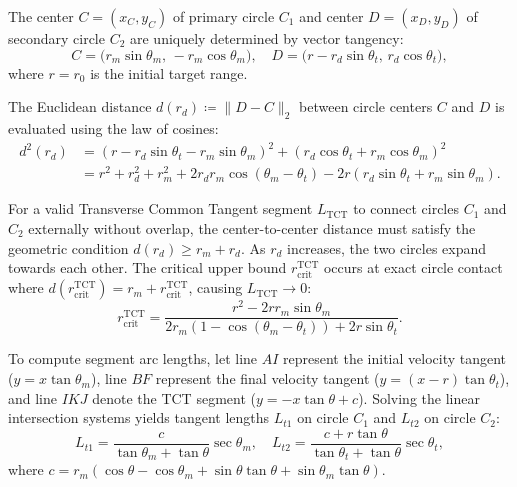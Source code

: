 The center $C = (x_C, y_C)$ of primary circle $C_1$ and center $D = (x_D, y_D)$ of secondary circle $C_2$ are uniquely determined by vector tangency:
\begin{equation}\label{eq:ch_DP_centers_samesign}
	C = \big(r_m \sin \theta_m, \, -r_m \cos \theta_m\big), \quad D = \big(r - r_d \sin \theta_t, \, r_d \cos \theta_t\big),
\end{equation}
where $r = r_0$ is the initial target range.

The Euclidean distance $d(r_d) \coloneqq \|D - C\|_2$ between circle centers $C$ and $D$ is evaluated using the law of cosines:
\begin{align}\label{eq:ch_DP_center_distance}
	d^2(r_d) &= (r - r_d \sin \theta_t - r_m \sin \theta_m)^2 + (r_d \cos \theta_t + r_m \cos \theta_m)^2 \nonumber \\
	&= r^2 + r_d^2 + r_m^2 + 2 r_d r_m \cos(\theta_m - \theta_t) - 2 r (r_d \sin \theta_t + r_m \sin \theta_m).
\end{align}

For a valid Transverse Common Tangent segment $L_{\text{TCT}}$ to connect circles $C_1$ and $C_2$ externally without overlap, the center-to-center distance must satisfy the geometric condition $d(r_d) \ge r_m + r_d$. As $r_d$ increases, the two circles expand towards each other. The critical upper bound $r_{\text{crit}}^{\text{TCT}}$ occurs at exact circle contact where $d(r_{\text{crit}}^{\text{TCT}}) = r_m + r_{\text{crit}}^{\text{TCT}}$, causing $L_{\text{TCT}} \to 0$:
\begin{equation}\label{eq:ch_DP_rcrit_tct}
	r_{\text{crit}}^{\text{TCT}} = \frac{r^2 - 2 r r_m \sin \theta_m}{2 r_m \left(1 - \cos(\theta_m - \theta_t)\right) + 2 r \sin \theta_t}.
\end{equation}

To compute segment arc lengths, let line $AI$ represent the initial velocity tangent ($y = x \tan \theta_m$), line $BF$ represent the final velocity tangent ($y = (x - r) \tan \theta_t$), and line $IKJ$ denote the TCT segment ($y = -x \tan \theta + c$). Solving the linear intersection systems yields tangent lengths $L_{t1}$ on circle $C_1$ and $L_{t2}$ on circle $C_2$:
\begin{equation}\label{eq:ch_DP_tangent_lengths}
	L_{t1} = \frac{c}{\tan \theta_m + \tan \theta} \sec \theta_m, \quad L_{t2} = \frac{c + r \tan \theta}{\tan \theta_t + \tan \theta} \sec \theta_t,
\end{equation}
where $c = r_m (\cos \theta - \cos \theta_m + \sin \theta \tan \theta + \sin \theta_m \tan \theta)$.

